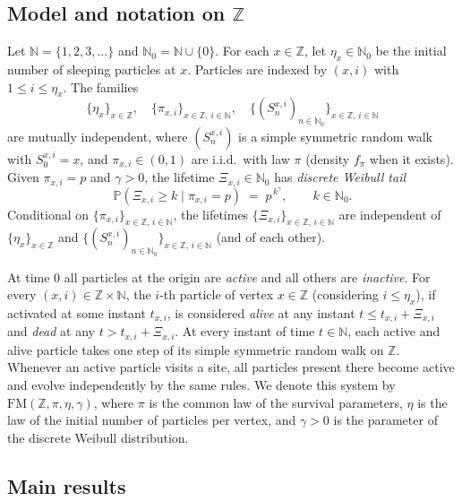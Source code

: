 \documentclass[preprint]{imsart}
\newcommand{\PP}{\mathbb{P}}
\newcommand{\1}{\mathbf{1}}
\theoremstyle{plain}
\theoremstyle{definition}
\begin{document}
\subsection*{Model and notation on $\mathbb{Z}$}
Let $\mathbb{N}=\{1,2,3,\dots\}$ and $\mathbb{N}_0=\mathbb{N}\cup\{0\}$. For each $x\in\mathbb{Z}$, let $\eta_x\in\mathbb{N}_0$ be the initial number of sleeping particles at $x$. Particles are indexed by $(x,i)$ with $1\le i\le \eta_x$. The families
\[
\{\eta_x\}_{x\in\mathbb{Z}},\quad \{\pi_{x,i}\}_{x\in\mathbb{Z},\,i\in\mathbb{N}},\quad
\{(S^{x,i}_n)_{n\in\mathbb{N}_0}\}_{x\in\mathbb{Z},\,i\in\mathbb{N}}
\]
are mutually independent, where $(S^{x,i}_n)$ is a simple symmetric random walk with $S^{x,i}_0=x$, and $\pi_{x,i}\in(0,1)$ are i.i.d.\ with law $\pi$ (density $f_\pi$ when it exists). Given $\pi_{x,i}=p$ and $\gamma>0$, the lifetime $\Xi_{x,i}\in\mathbb{N}_0$ has \emph{discrete Weibull tail}
\begin{equation}\label{eq:dw-survival-model}
\PP(\Xi_{x,i}\ge k\mid \pi_{x,i}=p)\;=\;p^{\,k^{\gamma}},\qquad k\in\mathbb{N}_0.
\end{equation}
Conditional on $\{\pi_{x,i}\}_{x\in\mathbb{Z},\,i\in\mathbb{N}}$, the lifetimes $\{\Xi_{x,i}\}_{x\in\mathbb{Z},\,i\in\mathbb{N}}$ are independent of \(
\{\eta_x\}_{x\in\mathbb{Z}}\) and \(\{(S^{x,i}_n)_{n\in\mathbb{N}_0}\}_{x\in\mathbb{Z},\,i\in\mathbb{N}}\) (and of each other).

At time $0$ all particles at the origin are \emph{active} and all others are \emph{inactive}. For every $(x,i)\in \mathbb{Z}\times\mathbb{N}$, the $i$-th particle of vertex $x\in\mathbb{Z}$ (considering $i\le \eta_x$), if activated at some instant $t_{x,i}$, is considered \emph{alive} at any instant $t\le t_{x,i}+\Xi_{x,i}$ and \emph{dead} at any $t>t_{x,i}+\Xi_{x,i}$. At every instant of time $t\in\mathbb{N}$, each active and alive particle takes one step of its simple symmetric random walk on $\mathbb{Z}$. Whenever an active particle visits a site, all particles
present there become active and evolve independently by the same rules. We denote this system by $\mathrm{FM}(\mathbb{Z},\pi,\eta,\gamma)$, where $\pi$ is the common law of the survival parameters, $\eta$ is the law of the initial number of particles per vertex, and $\gamma>0$ is the parameter of the discrete Weibull distribution.

\subsection*{Main results}
\end{document}
